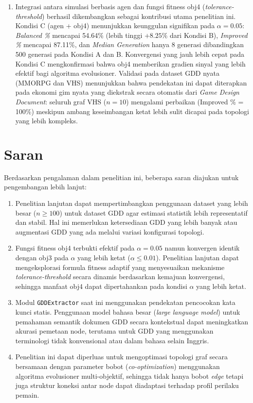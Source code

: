 \begin{enumerate}
            \item Integrasi antara simulasi berbasis agen dan fungsi fitness obj4 (\textit{tolerance-threshold}) berhasil dikembangkan sebagai kontribusi utama penelitian ini. Kondisi C (agen + obj4) menunjukkan keunggulan signifikan pada $\alpha = 0.05$: \textit{Balanced \%} mencapai 54.64\% (lebih tinggi $+8.25\%$ dari Kondisi B), \textit{Improved \%} mencapai 87.11\%, dan \textit{Median Generation} hanya 8 generasi dibandingkan 500 generasi pada Kondisi A dan B. Konvergensi yang jauh lebih cepat pada Kondisi C mengkonfirmasi bahwa obj4 memberikan gradien sinyal yang lebih efektif bagi algoritma evolusioner. Validasi pada dataset GDD nyata (MMORPG dan VHS) menunjukkan bahwa pendekatan ini dapat diterapkan pada ekonomi gim nyata yang diekstrak secara otomatis dari \textit{Game Design Document}: seluruh graf VHS ($n=10$) mengalami perbaikan (Improved \% = 100\%) meskipun ambang keseimbangan ketat lebih sulit dicapai pada topologi yang lebih kompleks.
        \end{enumerate}

    \section{Saran}

        Berdasarkan pengalaman dalam penelitian ini, beberapa saran diajukan untuk pengembangan lebih lanjut:

        \begin{enumerate}
            \item Penelitian lanjutan dapat mempertimbangkan penggunaan dataset yang lebih besar ($n \geq 100$) untuk dataset GDD agar estimasi statistik lebih representatif dan stabil. Hal ini memerlukan ketersediaan GDD yang lebih banyak atau augmentasi GDD yang ada melalui variasi konfigurasi topologi.

            \item Fungsi fitness obj4 terbukti efektif pada $\alpha = 0.05$ namun konvergen identik dengan obj3 pada $\alpha$ yang lebih ketat ($\alpha \leq 0.01$). Penelitian lanjutan dapat mengeksplorasi formula fitness adaptif yang menyesuaikan mekanisme \textit{tolerance-threshold} secara dinamis berdasarkan kemajuan konvergensi, sehingga manfaat obj4 dapat dipertahankan pada kondisi $\alpha$ yang lebih ketat.

            \item Modul \texttt{GDDExtractor} saat ini menggunakan pendekatan pencocokan kata kunci statis. Penggunaan model bahasa besar (\textit{large language model}) untuk pemahaman semantik dokumen GDD secara kontekstual dapat meningkatkan akurasi pemetaan node, terutama untuk GDD yang menggunakan terminologi tidak konvensional atau dalam bahasa selain Inggris.

            \item Penelitian ini dapat diperluas untuk mengoptimasi topologi graf secara bersamaan dengan parameter bobot (\textit{co-optimization}) menggunakan algoritma evolusioner multi-objektif, sehingga tidak hanya bobot \textit{edge} tetapi juga struktur koneksi antar node dapat diadaptasi terhadap profil perilaku pemain.
        \end{enumerate}

